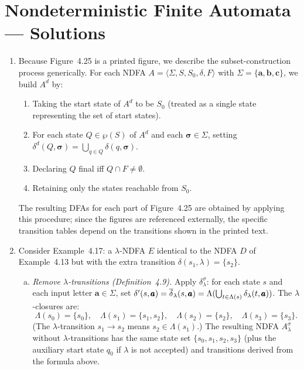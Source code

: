 
\chapter{Nondeterministic Finite Automata --- Solutions}

\begin{enumerate}[{4.}1.]

\item Because Figure~4.25 is a printed figure, we describe the subset-construction
process generically.  For each NDFA $A=\langle\Sigma,S,S_0,\delta,F\rangle$
with $\Sigma=\{\pmb{a},\pmb{b},\pmb{c}\}$, we build $A^d$ by:
\begin{enumerate}[(1)]
  \item Taking the start state of $A^d$ to be $S_0$ (treated as a single state
        representing the set of start states).
  \item For each state $Q\in\wp(S)$ of $A^d$ and each $\pmb{\sigma}\in\Sigma$,
        setting $\delta^d(Q,\pmb{\sigma})=\bigcup_{q\in Q}\delta(q,\pmb{\sigma})$.
  \item Declaring $Q$ final iff $Q\cap F\neq\emptyset$.
  \item Retaining only the states reachable from $S_0$.
\end{enumerate}
The resulting DFAs for each part of Figure~4.25 are obtained by applying this
procedure; since the figures are referenced externally, the specific transition
tables depend on the transitions shown in the printed text.

\item Consider Example~4.17: a $\lambda$-NDFA $E$ identical to the NDFA $D$
of Example~4.13 but with the extra transition $\delta(s_1,\lambda)=\{s_2\}$.

\begin{enumerate}[(a)]
  \item \emph{Remove $\lambda$-transitions (Definition~4.9).}  Apply
  $\delta^{\sigma}_{\lambda}$: for each state $s$ and each input letter
  $\pmb{a}\in\Sigma$, set
  $\delta'(s,\pmb{a})=\overline{\delta}_{\lambda}(s,\pmb{a})=\Lambda(\bigcup_{t\in\Lambda(s)}\delta_\lambda(t,\pmb{a}))$.
  The $\lambda$-closures are:
  \[
    \Lambda(s_0)=\{s_0\},\quad \Lambda(s_1)=\{s_1,s_2\},\quad \Lambda(s_2)=\{s_2\},\quad \Lambda(s_3)=\{s_3\}.
  \]
  (The $\lambda$-transition $s_1\to s_2$ means $s_2\in\Lambda(s_1)$.)
  The resulting NDFA $A^{\sigma}_\lambda$ without $\lambda$-transitions has the
  same state set $\{s_0,s_1,s_2,s_3\}$ (plus the auxiliary start state $q_0$
  if $\lambda$ is not accepted) and transitions derived from the formula above.


\end{enumerate}
\end{enumerate}
